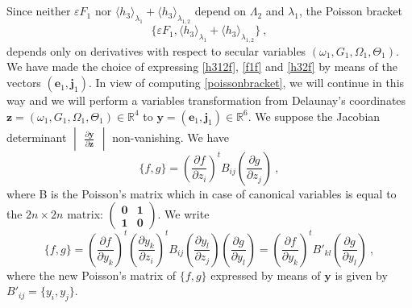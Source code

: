 \documentclass[a4paper]{article}
\begin{document}
\subsection{}
\label{averagingcp}
Since neither $\varepsilon F_{1}$ nor $\langle  h_{3} \rangle  _{\lambda_{1}} +  \langle h_{3} \rangle _{\lambda_{1,2}}$ depend on $\Lambda_{2}$ and $\lambda_{1}$, the Poisson bracket 
\begin{equation}
\label{poissonbracket}
\{\varepsilon F_{1}, \langle  h_{3} \rangle  _{\lambda_{1}} +  \langle h_{3} \rangle _{\lambda_{1,2}}\} \ ,
\end{equation}
depends only on derivatives with respect to secular variables $(\omega_{1},G_{1},\Omega_{1},\Theta_{1})$.
We have made the choice of expressing \eqref{h312f}, \eqref{f1f} and \eqref{h32f} by means of the vectors $(\mathbf e_{1},\mathbf j_{1})$. In view of computing \eqref{poissonbracket}, we will continue in this way and we will perform a variables transformation from Delaunay's coordinates $\mathbf z=(\omega_{1},G_{1},\Omega_{1},\Theta_{1})\in\mathbb R^{4}$ to $\mathbf y=(\mathbf e_{1},\mathbf j_{1})\in\mathbb R^{6}$.
We suppose the Jacobian determinant $\begin{vmatrix} \frac{\partial \mathbf y}{\partial \mathbf z} \end{vmatrix}$ non-vanishing.
We have 
\begin{equation}
\{f,g\}=\left(\frac{\partial f}{\partial z_{i}}\right)^{t} B_{ij} \left(\frac{\partial g}{\partial z_{j}}\right) \ ,
\end{equation}
where B is the Poisson's matrix which in case of canonical variables is equal to the $2n \times 2n$ matrix:
$\begin{pmatrix} 
\mathbf 0 & \mathbf 1 \\
\mathbf 1 & \mathbf 0
\end{pmatrix}$.
We write
\begin{equation}
\{f,g\}=\left(\frac{\partial f}{\partial y_{k}}\right)^{t} \left(\frac{\partial y_{k}}{\partial z_{i}}\right)^{t} B_{ij} \left(\frac{\partial y_{l}}{\partial z_{j}}\right) \left(\frac{\partial g}{\partial y_{l}}\right)
=\left(\frac{\partial f}{\partial y_{k}}\right)^{t} B'_{kl} \left(\frac{\partial g}{\partial y_{l}}\right) \ ,
\end{equation}
where the new Poisson's matrix of $\{f,g\}$ expressed by means of $\mathbf y$ is given by $B'_{ij}=\{y_{i},y_{j}\}$. \\
\end{document}
